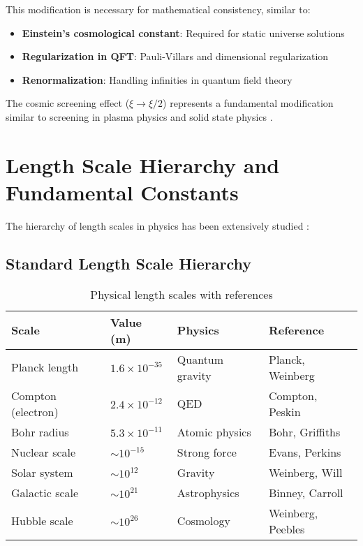 \documentclass[12pt,a4paper]{article}
\begin{document}
	This modification is necessary for mathematical consistency, similar to:
	\begin{itemize}
		\item \textbf{Einstein's cosmological constant}: Required for static universe solutions \citep{einstein1917}
		\item \textbf{Regularization in QFT}: Pauli-Villars and dimensional regularization \citep{peskin1995}
		\item \textbf{Renormalization}: Handling infinities in quantum field theory \citep{collins1984}
	\end{itemize}
	
	The cosmic screening effect ($\xi \to \xi/2$) represents a fundamental modification similar to screening in plasma physics \citep{chen1984} and solid state physics \citep{ashcroft1976}.
	
	\section{Length Scale Hierarchy and Fundamental Constants}
	\label{sec:length_scales}
	
	The hierarchy of length scales in physics has been extensively studied \citep{weinberg1995,wilczek2001,carr2007}:
	
	\subsection{Standard Length Scale Hierarchy}
	\label{subsec:standard_hierarchy}
	
	\begin{table}[htbp]
		\centering
		\footnotesize
		\begin{tabular}{p{2.5cm}p{2.2cm}p{2cm}p{4.5cm}}
			\toprule
			\textbf{Scale} & \textbf{Value (m)} & \textbf{Physics} & \textbf{Reference} \\
			\midrule
			Planck length & $1.6 \times 10^{-35}$ & Quantum gravity & Planck, Weinberg \\
			Compton (electron) & $2.4 \times 10^{-12}$ & QED & Compton, Peskin \\
			Bohr radius & $5.3 \times 10^{-11}$ & Atomic physics & Bohr, Griffiths \\
			Nuclear scale & $\sim 10^{-15}$ & Strong force & Evans, Perkins \\
			Solar system & $\sim 10^{12}$ & Gravity & Weinberg, Will \\
			Galactic scale & $\sim 10^{21}$ & Astrophysics & Binney, Carroll \\
			Hubble scale & $\sim 10^{26}$ & Cosmology & Weinberg, Peebles \\
			\bottomrule
		\end{tabular}
		\caption{Physical length scales with references}
		\label{tab:length_scales}
	\end{table}
	
\end{document}
